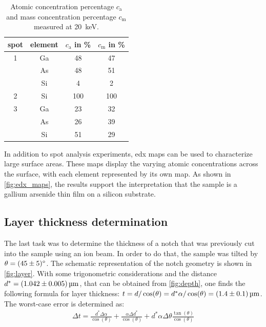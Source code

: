 \begin{table}
	\centering
	\begin{tabular}{cccc}
		\toprule
		spot & element & $c_\mathrm{a}$ in \unit{\percent } & $c_\mathrm{m}$ in \unit{\percent} \\
		\midrule
		1    & Ga      & 48                                 & 47                                \\
		     & As      & 48                                 & 51                                \\
		     & Si      & 4                                  & 2                                 \\
		\midrule
		2    & Si      & 100                                & 100                               \\
		\midrule
		3    & Ga      & 23                                 & 32                                \\
		     & As      & 26                                 & 39                                \\
		     & Si      & 51                                 & 29                                \\
		\bottomrule
	\end{tabular}
	\caption{Atomic concentration percentage $c_\mathrm{a}$ and mass
		concentration percentage $c_\mathrm{m}$ measured at
		\qty{20}{\kilo\electronvolt}.}
	\label{tab:edx_2}
\end{table}

In addition to spot analysis experiments, \ac{edx} maps can be used to
characterize large surface areas.
These maps display the varying atomic concentrations across the
surface, with each element represented by its own map.
As shown in \cref{fig:edx_maps}, the results support the
interpretation that the sample is a gallium arsenide thin film
on a silicon substrate.

\subsection{Layer thickness determination}
The last task was to determine the thickness of a notch that was
previously cut into the sample using an ion beam.
In order to do that, the sample was tilted by $\theta=\qty{45 \pm 5}{\degree}$.
The schematic representation of the notch geometry is shown
in \cref{fig:layer}.
With some trigonometric considerations and the distance
$d^*=\qty{1.042 \pm 0.005}{\micro\meter}$, that can be obtained from
\cref{fig:depth},
one finds the following formula for layer thickness:
$t = d / \cos(\theta) = d^* \alpha / \cos(\theta)
	= \qty{1.4\pm 0.1}{\micro\meter}$.
The worst-case error is determined as:
\begin{align}
	\Delta t=\frac{d^{*}\Delta\alpha}{\cos(\theta)}
	+\frac{\alpha\Delta d^{*}}{\cos( \theta)}
	+d^{*}\alpha\Delta\theta \frac{\tan(\theta)}{\cos(\theta)}
\end{align}




